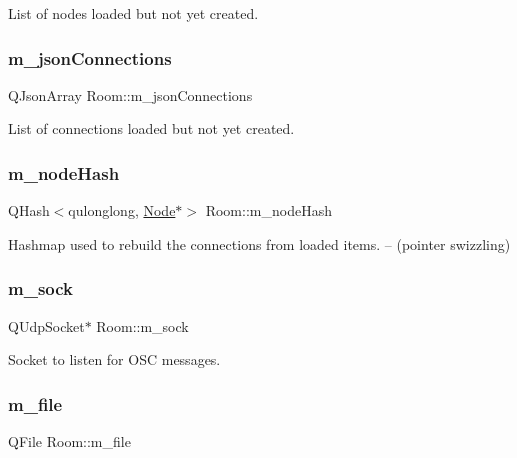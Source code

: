List of nodes loaded but not yet created. \mbox{\label{classRoom_a9d19c870844f064eb724412ec10ef7f2}} 
\subsubsection{\texorpdfstring{m\+\_\+json\+Connections}{m\_jsonConnections}}
{\footnotesize\ttfamily Q\+Json\+Array Room\+::m\+\_\+json\+Connections\hspace{0.3cm}{\ttfamily [private]}}

List of connections loaded but not yet created. \mbox{\label{classRoom_ace06dd46446e3ca79533f99b1723cf97}} 
\subsubsection{\texorpdfstring{m\+\_\+node\+Hash}{m\_nodeHash}}
{\footnotesize\ttfamily Q\+Hash$<$qulonglong, \mbox{\hyperlink{classNode}{Node}}$\ast$$>$ Room\+::m\+\_\+node\+Hash\hspace{0.3cm}{\ttfamily [private]}}

Hashmap used to rebuild the connections from loaded items. -- (pointer swizzling) \mbox{\label{classRoom_a726013d07c3e655f21822f720a89cea7}} 
\subsubsection{\texorpdfstring{m\+\_\+sock}{m\_sock}}
{\footnotesize\ttfamily Q\+Udp\+Socket$\ast$ Room\+::m\+\_\+sock\hspace{0.3cm}{\ttfamily [private]}}

Socket to listen for O\+SC messages. \mbox{\label{classRoom_a66ea178fb6c6c69842498b87abac816a}} 
\subsubsection{\texorpdfstring{m\+\_\+file}{m\_file}}
{\footnotesize\ttfamily Q\+File Room\+::m\+\_\+file\hspace{0.3cm}{\ttfamily [private]}}

